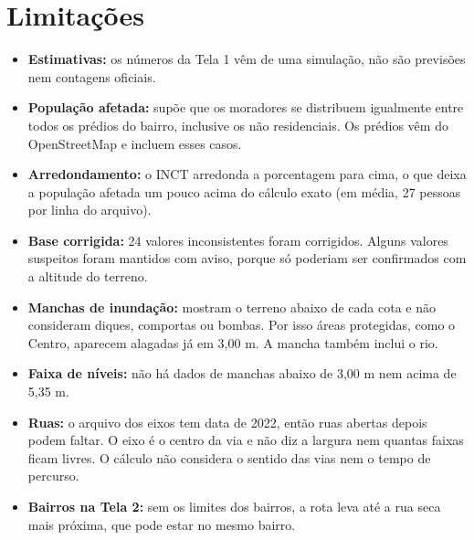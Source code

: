 \documentclass[12pt,a4paper]{article}
\begin{document}
\section{Limitações}
    \begin{itemize}
        \item \textbf{Estimativas:} os números da Tela 1 vêm de uma simulação, não são previsões nem contagens oficiais.
        \item \textbf{População afetada:} supõe que os moradores se distribuem igualmente entre todos os prédios do bairro, inclusive os não residenciais. Os prédios vêm do OpenStreetMap e incluem esses casos.
        \item \textbf{Arredondamento:} o INCT arredonda a porcentagem para cima, o que deixa a população afetada um pouco acima do cálculo exato (em média, 27 pessoas por linha do arquivo).
        \item \textbf{Base corrigida:} 24 valores inconsistentes foram corrigidos. Alguns valores suspeitos foram mantidos com aviso, porque só poderiam ser confirmados com a altitude do terreno.
        \item \textbf{Manchas de inundação:} mostram o terreno abaixo de cada cota e não consideram diques, comportas ou bombas. Por isso áreas protegidas, como o Centro, aparecem alagadas já em 3,00 m. A mancha também inclui o rio.
        \item \textbf{Faixa de níveis:} não há dados de manchas abaixo de 3,00 m nem acima de 5,35 m.
        \item \textbf{Ruas:} o arquivo dos eixos tem data de 2022, então ruas abertas depois podem faltar. O eixo é o centro da via e não diz a largura nem quantas faixas ficam livres. O cálculo não considera o sentido das vias nem o tempo de percurso.
        \item \textbf{Bairros na Tela 2:} sem os limites dos bairros, a rota leva até a rua seca mais próxima, que pode estar no mesmo bairro.
    \end{itemize}
\end{document}
